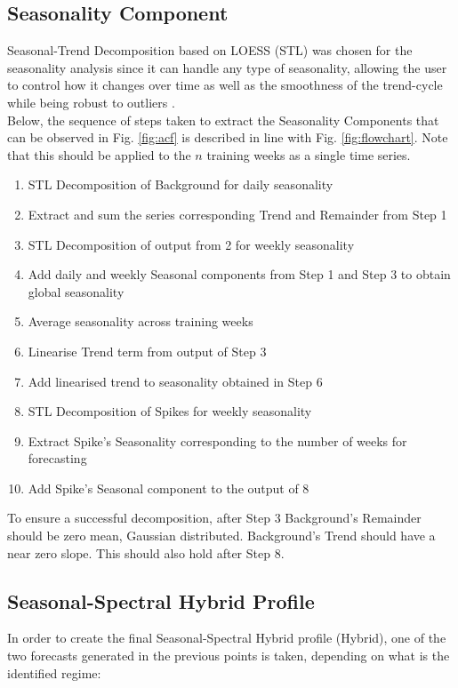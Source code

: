 \documentclass[conference, letterpaper]{IEEEtran}
\begin{document}
\subsection{Seasonality Component}
Seasonal-Trend Decomposition based on LOESS (STL) \cite{STL} was chosen for the seasonality analysis since it can handle any type of seasonality, allowing the user to control how it changes over time as well as the smoothness of the trend-cycle while being robust to outliers \cite{forecasting}.\\

Below, the sequence of steps taken to extract the Seasonality Components that can be observed in Fig. \ref{fig:acf} is described in line with Fig. \ref{fig:flowchart}. 
Note that this should be applied to the $n$ training weeks as a single time series.
\begin{enumerate}
	\item STL Decomposition of Background for daily seasonality
	\item Extract and sum the series corresponding Trend and Remainder from Step 1
	\item STL Decomposition of output from 2 for weekly seasonality
	\item Add daily and weekly Seasonal components from Step 1 and Step 3 to obtain global seasonality
	\item Average seasonality across training weeks
	\item Linearise Trend term from output of Step 3
	\item Add linearised trend to seasonality obtained in Step 6
	\item STL Decomposition of Spikes for weekly seasonality
	\item Extract Spike's Seasonality corresponding to the number of weeks for forecasting
	\item Add Spike's Seasonal component to the output of 8
\end{enumerate}
To ensure a successful decomposition, after Step 3  Background's Remainder should be zero mean, Gaussian distributed. Background's Trend should have a near zero slope. This should also hold after Step 8.
\subsection{Seasonal-Spectral Hybrid Profile}
In order to create the final Seasonal-Spectral Hybrid profile (Hybrid), one of the two forecasts generated in the previous points is taken, depending on what is the identified regime: 
\end{document}

